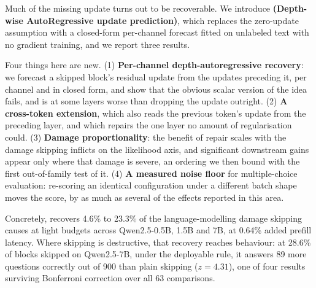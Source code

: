 Much of the missing update turns out to be recoverable. We introduce \textbf{\mname
(Depth-wise AutoRegressive update prediction)}, which replaces the zero-update assumption
with a closed-form per-channel forecast fitted on unlabeled text with no gradient
training, and we report three results.

Four things here are new. (1) \textbf{Per-channel depth-autoregressive recovery}: we forecast a
skipped block's residual update from the updates preceding it, per channel and in closed form,
and show that the obvious scalar version of the idea fails, and is at some layers worse than
dropping the update outright. (2) \textbf{A cross-token extension}, which also reads the previous
token's update from the preceding layer, and which repairs the one layer no amount of
regularisation could. (3) \textbf{Damage proportionality}: the benefit of repair scales with the
damage skipping inflicts on the likelihood axis, and significant downstream gains appear only
where that damage is severe,
an ordering we then bound with the first out-of-family test of it. (4) \textbf{A measured noise
floor} for multiple-choice evaluation: re-scoring an identical configuration under a different
batch shape moves the score, by as much as several of the effects reported in this area.

Concretely, \mname recovers 4.6\% to 23.3\% of the language-modelling damage skipping causes at
light budgets across Qwen2.5-0.5B, 1.5B and 7B, at 0.64\% added prefill latency. Where skipping
is destructive, that recovery reaches behaviour: at 28.6\% of blocks skipped on Qwen2.5-7B,
under the deployable rule, it answers 89 more questions correctly out of 900 than plain skipping
($z=4.31$), one of four results surviving Bonferroni correction over all 63 comparisons.
